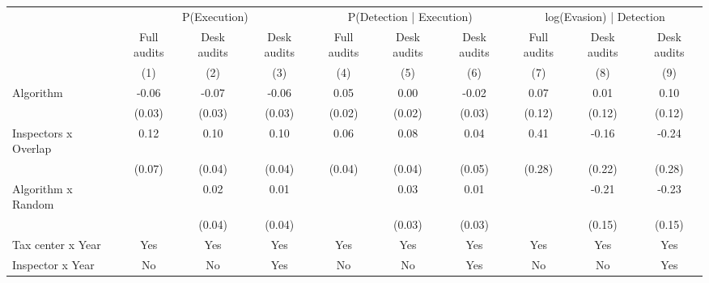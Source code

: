 \begin{tabular}{lccc|ccc|ccc} \toprule
\multicolumn{1}{l}{} & \multicolumn{3}{c}{P(Execution)} & \multicolumn{3}{c}{P(Detection | Execution)} & \multicolumn{3}{c}{log(Evasion) | Detection} \\\cmidrule(lr){2-4}\cmidrule(lr){5-7}\cmidrule(lr){8-10} \multicolumn{1}{l}{} & Full audits & Desk audits & Desk audits & Full audits & Desk audits & Desk audits & Full audits & Desk audits & Desk audits \\ \multicolumn{1}{l}{} & (1) & (2) & (3) & (4) & (5) & (6) & (7) & (8) & (9) \\ \midrule
Algorithm   &       -0.06\sym{*}  &       -0.07\sym{**} &       -0.06\sym{**} &        0.05\sym{**} &        0.00         &       -0.02         &        0.07         &        0.01         &        0.10         \\
            &      (0.03)         &      (0.03)         &      (0.03)         &      (0.02)         &      (0.02)         &      (0.03)         &      (0.12)         &      (0.12)         &      (0.12)         \\
\addlinespace
Inspectors x Overlap&        0.12\sym{*}  &        0.10\sym{**} &        0.10\sym{**} &        0.06\sym{*}  &        0.08\sym{**} &        0.04         &        0.41         &       -0.16         &       -0.24         \\
            &      (0.07)         &      (0.04)         &      (0.04)         &      (0.04)         &      (0.04)         &      (0.05)         &      (0.28)         &      (0.22)         &      (0.28)         \\
\addlinespace
Algorithm x Random&                     &        0.02         &        0.01         &                     &        0.03         &        0.01         &                     &       -0.21         &       -0.23         \\
            &                     &      (0.04)         &      (0.04)         &                     &      (0.03)         &      (0.03)         &                     &      (0.15)         &      (0.15)         \\
\midrule
Tax center x Year&         Yes         &         Yes         &         Yes         &         Yes         &         Yes         &         Yes         &         Yes         &         Yes         &         Yes         \\
Inspector x Year&          No         &          No         &         Yes         &          No         &          No         &         Yes         &          No         &          No         &         Yes         \\

\end{tabular}
